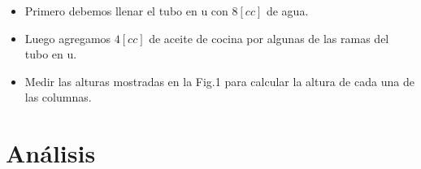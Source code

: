 \documentclass[a4paper, 12p]{article}
\begin{document}
\begin{itemize}
      \item Primero debemos llenar el tubo en u con $8[cc]$ de agua.
      
      \item Luego agregamos $4[cc]$ de aceite de cocina por algunas de las ramas del tubo en u.
      
      \item Medir las alturas mostradas en la Fig.1 para calcular la altura de cada una de las columnas.
      
\end{itemize}

\section{Análisis}




\end{document}
